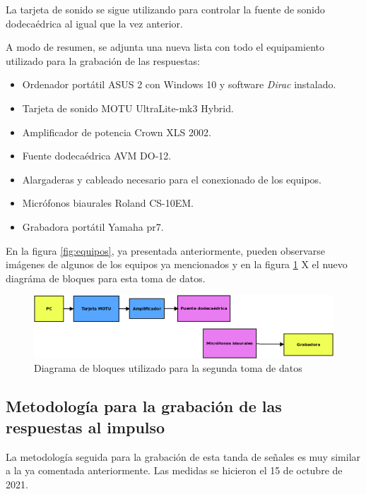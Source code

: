 \documentclass[11pt,a4paper]{book}
\begin{document}
            La tarjeta de sonido se sigue utilizando para controlar la fuente de sonido dodecaédrica al igual que la vez anterior.
                
            A modo de resumen, se adjunta una nueva lista con todo el equipamiento utilizado para la grabación de las respuestas:
                
            \begin{itemize}
                \item Ordenador portátil ASUS 2 con Windows 10 y software \textit{Dirac} instalado.
	            \item Tarjeta de sonido MOTU UltraLite-mk3 Hybrid.
	            \item Amplificador de potencia Crown XLS 2002.
	            \item Fuente dodecaédrica AVM DO-12.
	            \item Alargaderas y cableado necesario para el conexionado de los equipos.
	            \item Micrófonos biaurales Roland CS-10EM.
	            \item Grabadora portátil Yamaha pr7.
            \end{itemize}
                
            En la figura \ref{fig:equipos}, ya presentada anteriormente, pueden observarse imágenes de algunos de los equipos ya mencionados y en la figura \ref{fig:bloques2} X el nuevo diagráma de bloques para esta toma de datos.
            
            \begin{figure}
	            \includegraphics[scale=0.47]{../imagenes/diagrama_bloques2.png}
			    \centering
			    \caption{Diagrama de bloques utilizado para la segunda toma de datos}
			    \label{fig:bloques2}
	        \end{figure}
            
            
                
        \subsection{Metodología para la grabación de las respuestas al impulso}
            La metodología seguida para la grabación de esta tanda de señales es muy similar a la ya comentada anteriormente. Las medidas se hicieron el 15 de octubre de 2021.
                
\end{document}
